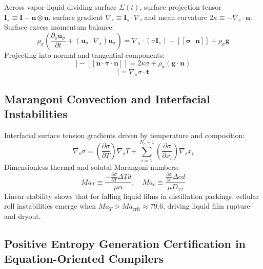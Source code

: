 \documentclass[11pt,a4paper]{article}
\begin{document}
Across vapor-liquid dividing surface $\Sigma(t)$, surface projection tensor $\mathbf{I}_s \equiv \mathbf{I} - \mathbf{n}\otimes\mathbf{n}$, surface gradient $\nabla_s \equiv \mathbf{I}_s \cdot \nabla$, and mean curvature $2\kappa \equiv -\nabla_s \cdot \mathbf{n}$.
Surface excess momentum balance:
\begin{equation}
\rho_\sigma \left( \frac{\partial_s \mathbf{u}_\sigma}{\partial t} + (\mathbf{u}_\sigma \cdot \nabla_s) \mathbf{u}_\sigma \right) = \nabla_s \cdot (\sigma \mathbf{I}_s) - [[\boldsymbol{\sigma} \cdot \mathbf{n}]] + \rho_\sigma \mathbf{g}
\end{equation}
Projecting into normal and tangential components:
\begin{equation}
[[P]] - [[\mathbf{n} \cdot \boldsymbol{\tau} \cdot \mathbf{n}]] = 2 \kappa \sigma + \rho_\sigma (\mathbf{g} \cdot \mathbf{n})
\end{equation}
\begin{equation}
[[\mathbf{n} \cdot \boldsymbol{\tau} \cdot \mathbf{t}]] = \nabla_s \sigma \cdot \mathbf{t}
\end{equation}

\subsection{Marangoni Convection and Interfacial Instabilities}
\label{subsec:marangoni-convection}

Interfacial surface tension gradients driven by temperature and composition:
\begin{equation}
\nabla_s \sigma = \left( \frac{\partial \sigma}{\partial T} \right) \nabla_s T + \sum_{i=1}^{N_c-1} \left( \frac{\partial \sigma}{\partial x_i} \right) \nabla_s x_i
\end{equation}
Dimensionless thermal and solutal Marangoni numbers:
\begin{equation}
Ma_T \equiv \frac{-\frac{\partial \sigma}{\partial T} \Delta T d}{\mu \alpha}, \quad Ma_c \equiv \frac{\frac{\partial \sigma}{\partial c} \Delta c d}{\mu D_{12}}
\end{equation}
Linear stability shows that for falling liquid films in distillation packings, cellular roll instabilities emerge when $Ma_T > Ma_{\text{crit}} \approx 79.6$, driving liquid film rupture and dryout.

\subsection{Positive Entropy Generation Certification in Equation-Oriented Compilers}
\label{subsec:entropy-certification}
\end{document}
